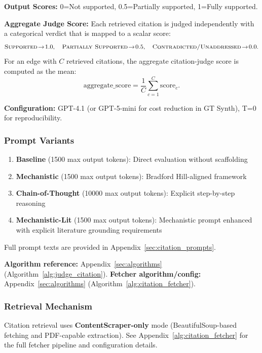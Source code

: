 \textbf{Output Scores:} 0=Not supported, 0.5=Partially supported, 1=Fully supported.

\textbf{Aggregate Judge Score:} Each retrieved citation is judged independently with a categorical verdict that is mapped to a scalar score:
\[
\textsc{Supported}\!\to\!1.0,\quad
\textsc{Partially Supported}\!\to\!0.5,\quad
\textsc{Contradicted/Unaddressed}\!\to\!0.0.
\]
For an edge with \(C\) retrieved citations, the aggregate citation-judge score is computed as the mean:
\[
\text{aggregate\_score}=\frac{1}{C}\sum_{c=1}^{C}\text{score}_c.
\]

\textbf{Configuration:} GPT-4.1 (or GPT-5-mini for cost reduction in GT Synth), T=0 for reproducibility.

\subsubsection{Prompt Variants}
\begin{enumerate}[noitemsep]
    \item \textbf{Baseline} (1500 max output tokens): Direct evaluation without scaffolding
    \item \textbf{Mechanistic} (1500 max output tokens): Bradford Hill-aligned framework
    \item \textbf{Chain-of-Thought} (10000 max output tokens): Explicit step-by-step reasoning
    \item \textbf{Mechanistic-Lit} (1500 max output tokens): Mechanistic prompt enhanced with explicit literature grounding requirements
\end{enumerate}
Full prompt texts are provided in Appendix~\ref{sec:citation_prompts}.

\textbf{Algorithm reference:} Appendix~\ref{sec:algorithms} (Algorithm~\ref{alg:judge_citation}). \textbf{Fetcher algorithm/config:} Appendix~\ref{sec:algorithms} (Algorithm~\ref{alg:citation_fetcher}).

\subsubsection{Retrieval Mechanism}

Citation retrieval uses \textbf{ContentScraper-only} mode (BeautifulSoup-based fetching and PDF-capable extraction). See Appendix~\ref{alg:citation_fetcher} for the full fetcher pipeline and configuration details.

